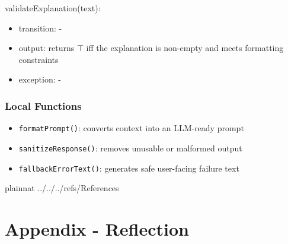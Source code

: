 \documentclass[12pt, titlepage]{article}
\begin{document}
\noindent validateExplanation(text):
\begin{itemize}
\item transition: -
\item output: returns $\top$ iff the explanation is non-empty and meets formatting constraints
\item exception: -
\end{itemize}

\subsubsection{Local Functions}
\begin{itemize}
\item \texttt{formatPrompt()}: converts context into an LLM-ready prompt
\item \texttt{sanitizeResponse()}: removes unusable or malformed output
\item \texttt{fallbackErrorText()}: generates safe user-facing failure text
\end{itemize}

\newpage

 {plainnat}
 {../../../refs/References}

\newpage{}


\section*{Appendix - Reflection}


%
\end{document}
